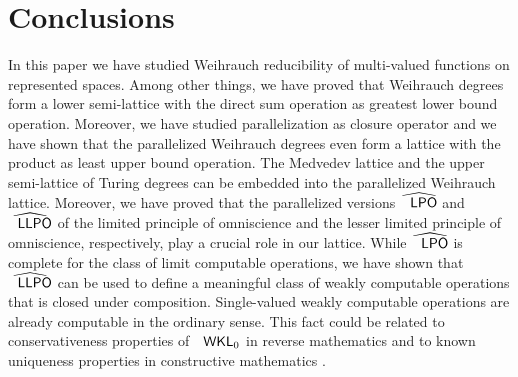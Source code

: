 \documentclass[jsl,10pt]{noasl}
\def\IR{{\mathbb{R}}}
\def\LPO{\text{\rm\sffamily LPO}}
\def\LLPO{\text{\rm\sffamily LLPO}}
\def\WKL{\text{\rm\sffamily WKL}}
\def\LPO{\text{\rm\sffamily LPO}}
\def\LLPO{\text{\rm\sffamily LLPO}}
\begin{document}


\section{Conclusions}

In this paper we have studied Weihrauch reducibility of multi-valued
functions on represented spaces. Among other things, we have proved
that Weihrauch degrees form a lower semi-lattice with the direct sum
operation as greatest lower bound operation. Moreover, we have studied
parallelization as closure operator and we have shown that the parallelized
Weihrauch degrees even form a lattice with the product as least upper
bound operation. 
The Medvedev lattice and the upper semi-lattice of
Turing degrees can be embedded into the parallelized Weihrauch lattice.
Moreover, we have proved that the parallelized versions $\widehat{\LPO}$ and
$\widehat{\LLPO}$ of the limited principle of omniscience and the lesser
limited principle of omniscience, respectively, play a crucial role in our
lattice. While $\widehat{\LPO}$ is complete for the class of limit computable
operations, we have shown that $\widehat{\LLPO}$ can be used to define
a meaningful class of weakly computable operations that is closed under
composition. Single-valued weakly computable operations are already computable
in the ordinary sense. This fact could be related to conservativeness properties
of $\WKL_0$ in reverse mathematics \cite{Sim99,STY02} and to known uniqueness properties in 
constructive mathematics \cite{Koh93,Sch06c,Sch07d,Ish07}. 
\end{document}
